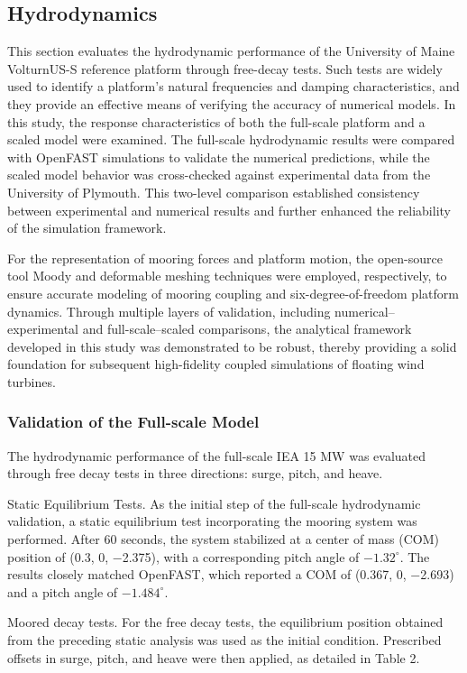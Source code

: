 \documentclass[%
 aip,
 amsmath,amssymb,
 reprint,%
]{revtex4-1}
\begin{document}
\subsection{Hydrodynamics}

This section evaluates the hydrodynamic performance of the University of Maine VolturnUS-S reference platform through free-decay tests. Such tests are widely used to identify a platform’s natural frequencies and damping characteristics, and they provide an effective means of verifying the accuracy of numerical models. In this study, the response characteristics of both the full-scale platform and a scaled model were examined. The full-scale hydrodynamic results were compared with OpenFAST simulations to validate the numerical predictions, while the scaled model behavior was cross-checked against experimental data from the University of Plymouth. This two-level comparison established consistency between experimental and numerical results and further enhanced the reliability of the simulation framework.

For the representation of mooring forces and platform motion, the open-source tool Moody and deformable meshing techniques were employed, respectively, to ensure accurate modeling of mooring coupling and six-degree-of-freedom platform dynamics. Through multiple layers of validation, including numerical–experimental and full-scale–scaled comparisons, the analytical framework developed in this study was demonstrated to be robust, thereby providing a solid foundation for subsequent high-fidelity coupled simulations of floating wind turbines.

\subsubsection{Validation of the Full-scale Model}

The hydrodynamic performance of the full-scale IEA 15 MW was evaluated through free decay tests in three directions: surge, pitch, and heave.

Static Equilibrium Tests. As the initial step of the full-scale hydrodynamic validation, a static equilibrium test incorporating the mooring system was performed. After 60 seconds, the system stabilized at a center of mass (COM) position of (0.3, 0, −2.375), with a corresponding pitch angle of $-1.32^\circ$. The results closely matched OpenFAST, which reported a COM of (0.367, 0, −2.693) and a pitch angle of $-1.484^\circ$.

Moored decay tests. For the free decay tests, the equilibrium position obtained from the preceding static analysis was used as the initial condition. Prescribed offsets in surge, pitch, and heave were then applied, as detailed in Table 2.
\end{document}
